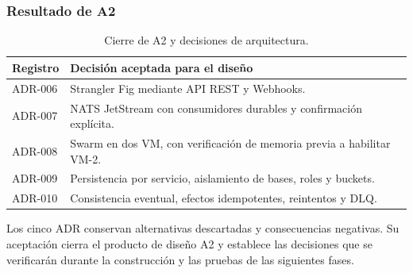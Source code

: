 \clearpage
\subsubsection{Resultado de A2}
\begin{table}[H]
\centering\small
\begin{tabularx}{\textwidth}{p{1.6cm}X}
\toprule
\textbf{Registro} & \textbf{Decisión aceptada para el diseño} \\
\midrule
ADR-006 & Strangler Fig mediante API REST y Webhooks. \\
ADR-007 & NATS JetStream con consumidores durables y confirmación explícita. \\
ADR-008 & Swarm en dos VM, con verificación de memoria previa a habilitar VM-2. \\
ADR-009 & Persistencia por servicio, aislamiento de bases, roles y buckets. \\
ADR-010 & Consistencia eventual, efectos idempotentes, reintentos y DLQ. \\
\bottomrule
\end{tabularx}
\caption{Cierre de A2 y decisiones de arquitectura.}
\label{tab:f5-a2-cierre}
\end{table}
Los cinco ADR conservan alternativas descartadas y consecuencias negativas. Su aceptación cierra el producto de diseño A2 y establece las decisiones que se verificarán durante la construcción y las pruebas de las siguientes fases.
\endgroup
